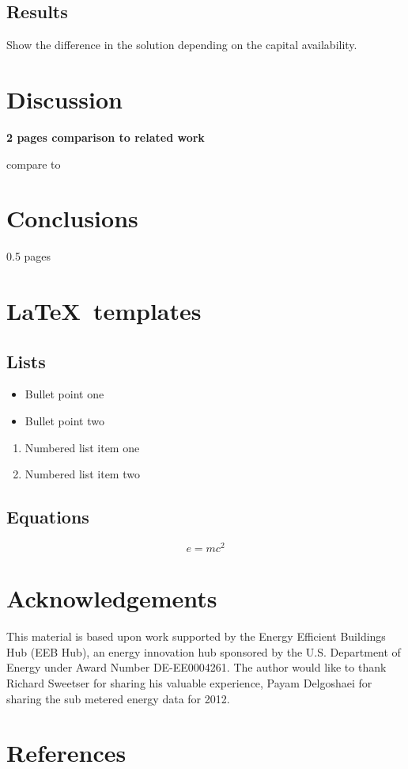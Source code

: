 \documentclass[review]{elsarticle}
\begin{document}
\subsection{Results}

Show the difference in the solution depending on the capital availability.

\section{Discussion}
\textbf{2 pages comparison to related work}

compare to \cite{Rysanek2013324}

\section{Conclusions}
0.5 pages

\section{\LaTeX\ templates}


\subsection{Lists}
\begin{itemize}
\item Bullet point one
\item Bullet point two
\end{itemize}

\begin{enumerate}
\item Numbered list item one
\item Numbered list item two
\end{enumerate}

\subsection{Equations}
\begin{equation}
\label{eq:emc}
e = mc^2
\end{equation}

\section*{Acknowledgements}
This material is based upon work supported by the Energy Efficient Buildings Hub (EEB Hub), an energy innovation hub sponsored by the U.S. Department of Energy under Award Number DE-EE0004261. The author would like to thank Richard Sweetser for sharing his valuable experience, Payam Delgoshaei for sharing the sub metered energy data for 2012.

\section*{References}

\end{document}
